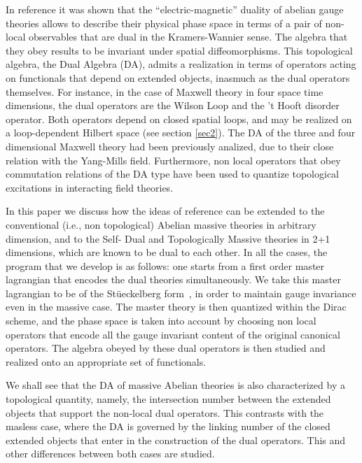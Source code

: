 \documentclass[a4paper,12pt]{article}
\begin{document}
In reference\cite{LL} it was shown that the ``electric-magnetic''
duality of abelian gauge theories allows to describe their
physical phase space in terms of a pair of non-local observables
that are dual in the Kramers-Wannier sense\cite{Kramers:1941kn}.
The algebra that they obey results to be invariant under spatial
diffeomorphisms. This topological algebra, the Dual Algebra (DA),
admits a realization in terms of operators acting on functionals
that depend on extended objects, inasmuch as the dual operators
themselves. For instance, in the case of Maxwell theory in four
space time dimensions, the dual operators are the Wilson Loop and
the 't Hooft disorder operator\cite{tHooft}. Both operators
depend on closed spatial loops, and may be realized on a
loop-dependent Hilbert space (see section \ref{sec2}). The DA of
the three and four dimensional Maxwell theory had been previously
analized\cite{AlgNL-Maxwell}, due to their close relation with the
Yang-Mills field. Furthermore, non local operators that obey
commutation relations of the DA type have been used to quantize
topological excitations in interacting field
theories\cite{Marino:1992rq}.

In this paper we discuss how the ideas of reference\cite{LL} can
be extended to the conventional (i.e., non topological) Abelian
massive theories in arbitrary dimension, and to the Self- Dual
\cite{TPN} and Topologically Massive theories\cite{DJT} in 2+1
dimensions, which are known to be dual to each other\cite{DJ}. In
all the cases, the program that we develop is as follows: one
starts from a first order master lagrangian that encodes the dual
theories simultaneously. We take this master lagrangian to be of
the St\"ueckelberg form~\cite{St}, in order to maintain gauge
invariance even in the massive case. The master theory is then
quantized within the Dirac scheme\cite{Dirac}, and the phase
space is taken into account by choosing non local operators that
encode all the gauge invariant content of the original canonical
operators. The algebra obeyed by these dual operators is then
studied and realized onto an appropriate set of functionals.

We shall see that the DA of massive Abelian theories is also
characterized by a topological quantity, namely, the intersection
number between the extended objects that support the non-local
dual operators. This contrasts with the masless case, where the
DA is governed by the linking number of the closed extended
objects that enter in the construction of the dual
operators\cite{LL,AlgNL-Maxwell}. This and other differences
between both cases are studied.
\end{document}
